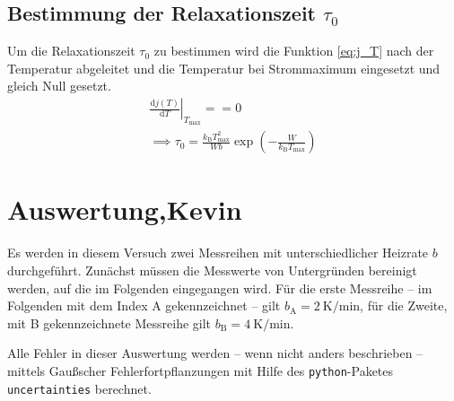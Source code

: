 \subsection{Bestimmung der Relaxationszeit \texorpdfstring{$\tau_{0}$}{T1}}
Um die Relaxationszeit $\tau_{0}$ zu bestimmen wird die Funktion \eqref{eq:j_T} nach der Temperatur abgeleitet und 
die Temperatur bei Strommaximum eingesetzt und gleich Null gesetzt.
\begin{gather*}
    \left.\frac{\text{d}j(T)}{\text{d}T}\right|_{T_{\text{max}}}= =0\\
    \implies \tau_0 = \frac{k_{\text{B}}T_{\text{max}}^2}{Wb}\exp{\left(-\frac{W}{k_{\text{B}}T_{\text{max}}}\right)}
\end{gather*}






















\section{Auswertung,Kevin}
Es werden in diesem Versuch zwei Messreihen mit unterschiedlicher Heizrate
$b$ durchgeführt. Zunächst müssen die Messwerte von Untergründen bereinigt
werden, auf die im Folgenden eingegangen wird.
Für die erste Messreihe -- im Folgenden mit dem Index A gekennzeichnet --
gilt $b_\text{A} = \SI{2}{\kelvin\per\minute}$, für die Zweite, mit B
gekennzeichnete Messreihe gilt $b_\text{B} = \SI{4}{\kelvin\per\minute}$.

Alle Fehler in dieser Auswertung werden -- wenn nicht anders beschrieben --
mittels Gaußscher Fehlerfortpflanzungen mit Hilfe des \texttt{python}-Paketes
\texttt{uncertainties} \cite{py-uncertainties} berechnet.

